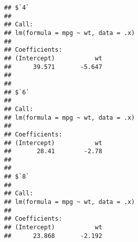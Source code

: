 \documentclass[
]{book}
\newenvironment{Shaded}{\begin{snugshade}}{\end{snugshade}}
\newcommand{\AttributeTok}[1]{\textcolor[rgb]{0.77,0.63,0.00}{#1}}
\newcommand{\FunctionTok}[1]{\textcolor[rgb]{0.00,0.00,0.00}{#1}}
\newcommand{\NormalTok}[1]{#1}
\newcommand{\SpecialCharTok}[1]{\textcolor[rgb]{0.00,0.00,0.00}{#1}}
\begin{document}
\begin{Shaded}
\end{Shaded}

\begin{verbatim}
## $`4`
## 
## Call:
## lm(formula = mpg ~ wt, data = .x)
## 
## Coefficients:
## (Intercept)           wt  
##      39.571       -5.647  
## 
## 
## $`6`
## 
## Call:
## lm(formula = mpg ~ wt, data = .x)
## 
## Coefficients:
## (Intercept)           wt  
##       28.41        -2.78  
## 
## 
## $`8`
## 
## Call:
## lm(formula = mpg ~ wt, data = .x)
## 
## Coefficients:
## (Intercept)           wt  
##      23.868       -2.192
\end{verbatim}

\begin{Shaded}
\end{Shaded}
\end{document}
